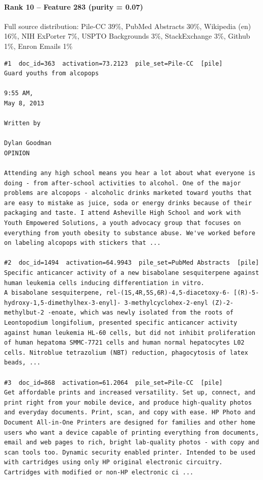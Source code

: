 \paragraph*{Rank 10 -- Feature 283 (purity = 0.07)}

Full source distribution: Pile-CC 39\%, PubMed Abstracts 30\%, Wikipedia (en) 16\%, NIH ExPorter 7\%, USPTO Backgrounds 3\%, StackExchange 3\%, Github 1\%, Enron Emails 1\%

\begin{verbatim}
#1  doc_id=363  activation=73.2123  pile_set=Pile-CC  [pile]
Guard youths from alcopops

9:55 AM,
May 8, 2013

Written by

Dylan Goodman
OPINION

Attending any high school means you hear a lot about what everyone is doing - from after-school activities to alcohol. One of the major problems are alcopops - alcoholic drinks marketed toward youths that are easy to mistake as juice, soda or energy drinks because of their packaging and taste. I attend Asheville High School and work with Youth Empowered Solutions, a youth advocacy group that focuses on everything from youth obesity to substance abuse. We've worked before on labeling alcopops with stickers that ...

#2  doc_id=1494  activation=64.9943  pile_set=PubMed Abstracts  [pile]
Specific anticancer activity of a new bisabolane sesquiterpene against human leukemia cells inducing differentiation in vitro.
A bisabolane sesquiterpene, rel-(1S,4R,5S,6R)-4,5-diacetoxy-6- [(R)-5-hydroxy-1,5-dimethylhex-3-enyl]- 3-methylcyclohex-2-enyl (Z)-2-methylbut-2 -enoate, which was newly isolated from the roots of Leontopodium longifolium, presented specific anticancer activity against human leukemia HL-60 cells, but did not inhibit proliferation of human hepatoma SMMC-7721 cells and human normal hepatocytes L02 cells. Nitroblue tetrazolium (NBT) reduction, phagocytosis of latex beads, ...

#3  doc_id=868  activation=61.2064  pile_set=Pile-CC  [pile]
Get affordable prints and increased versatility. Set up, connect, and print right from your mobile device, and produce high-quality photos and everyday documents. Print, scan, and copy with ease. HP Photo and Document All-in-One Printers are designed for families and other home users who want a device capable of printing everything from documents, email and web pages to rich, bright lab-quality photos - with copy and scan tools too. Dynamic security enabled printer. Intended to be used with cartridges using only HP original electronic circuitry. Cartridges with modified or non-HP electronic ci ...


\end{verbatim}
